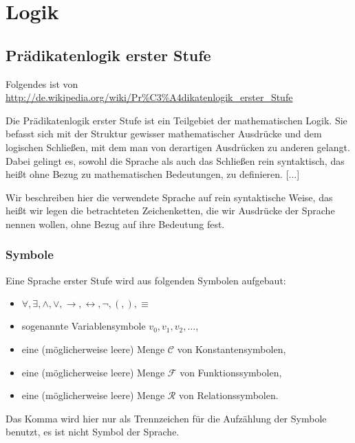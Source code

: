 \chapter{Logik}
\section{Prädikatenlogik erster Stufe}
Folgendes ist von \url{http://de.wikipedia.org/wiki/Pr%C3%A4dikatenlogik_erster_Stufe}

Die Prädikatenlogik erster Stufe ist ein Teilgebiet der mathematischen Logik. Sie befasst sich mit der Struktur gewisser mathematischer Ausdrücke und dem logischen Schließen, mit dem man von derartigen Ausdrücken zu anderen gelangt. Dabei gelingt es, sowohl die Sprache als auch das Schließen rein syntaktisch, das heißt ohne Bezug zu mathematischen Bedeutungen, zu definieren.
[...]

Wir beschreiben hier die verwendete Sprache auf rein syntaktische Weise, das heißt wir legen die betrachteten Zeichenketten, die wir Ausdrücke der Sprache nennen wollen, ohne Bezug auf ihre Bedeutung fest.

\subsection{Symbole}
Eine Sprache erster Stufe wird aus folgenden Symbolen aufgebaut:

\begin{itemize}
	\item $\forall, \exists, \land, \lor, \rightarrow, \leftrightarrow, \neg, (, ), \equiv$
	\item sogenannte Variablensymbole $v_0,v_1,v_2,\ldots$,
	\item eine (möglicherweise leere) Menge $\mathcal C$ von Konstantensymbolen,
	\item eine (möglicherweise leere) Menge $\mathcal F$ von Funktionssymbolen,
	\item eine (möglicherweise leere) Menge $\mathcal R$ von Relationssymbolen.
\end{itemize}

Das Komma wird hier nur als Trennzeichen für die Aufzählung der Symbole benutzt, es ist nicht Symbol der Sprache.

